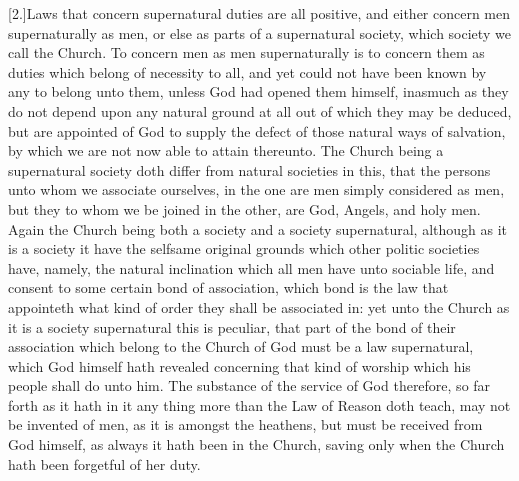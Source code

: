 [2.]Laws that concern supernatural duties are all positive, and either concern men supernaturally as men, or else as parts of a supernatural society, which society we call the Church. To concern men as men supernaturally is to concern them as duties which belong of necessity to all, and yet could not have been known by any to belong unto them, unless God had opened them himself, inasmuch as they do not depend upon any natural ground at all out of which they may be deduced, but are appointed of God to supply the defect of those natural ways of salvation, by which we are not now able to attain thereunto. The Church being a supernatural society doth differ from natural societies in this, that the persons unto whom we associate ourselves, in the one are men simply considered as men, but they to whom we be joined in the other, are God, Angels, and holy men. Again the Church being both a society and a society supernatural, although as it is a society it have the selfsame original  grounds which other politic societies have, namely, the natural inclination which all men have unto sociable life, and consent to some certain bond of association, which bond is the law that appointeth what kind of order they shall be associated in: yet unto the Church as it is a society supernatural this is peculiar, that part of the bond of their association which belong to the Church of God must be a law supernatural, which God himself hath revealed concerning that kind of worship which his people shall do unto him. The substance of the service of God therefore, so far forth as it hath in it any thing more than the Law of Reason doth teach, may not be invented of men, as it is amongst the heathens, but must be received from God himself, as always it hath been in the Church, saving only when the Church hath been forgetful of her duty.

